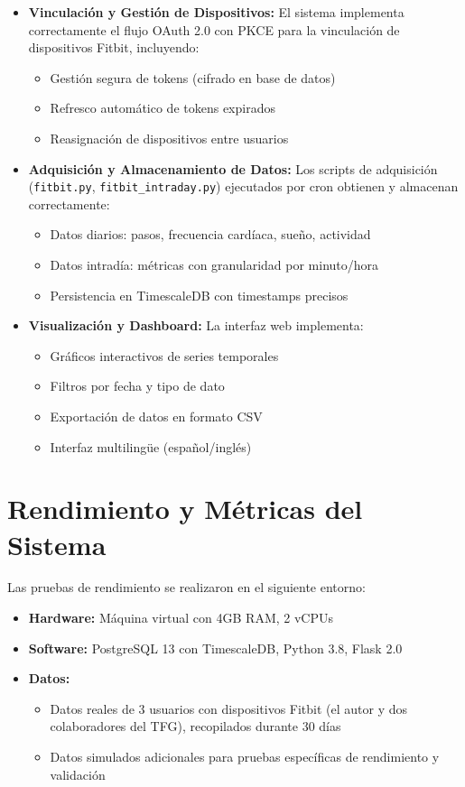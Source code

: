 \begin{itemize}
    \item \textbf{Vinculación y Gestión de Dispositivos:} El sistema implementa correctamente el flujo OAuth 2.0 con PKCE para la vinculación de dispositivos Fitbit\textsuperscript{\textregistered}, incluyendo:
        \begin{itemize}
            \item Gestión segura de tokens (cifrado en base de datos)
            \item Refresco automático de tokens expirados
            \item Reasignación de dispositivos entre usuarios
        \end{itemize}
    \item \textbf{Adquisición y Almacenamiento de Datos:} Los scripts de adquisición (\texttt{fitbit.py}, \texttt{fitbit\_intraday.py}) ejecutados por cron obtienen y almacenan correctamente:
        \begin{itemize}
            \item Datos diarios: pasos, frecuencia cardíaca, sueño, actividad
            \item Datos intradía: métricas con granularidad por minuto/hora
            \item Persistencia en TimescaleDB con timestamps precisos
        \end{itemize}
    \item \textbf{Visualización y Dashboard:} La interfaz web implementa:
        \begin{itemize}
            \item Gráficos interactivos de series temporales
            \item Filtros por fecha y tipo de dato
            \item Exportación de datos en formato CSV
            \item Interfaz multilingüe (español/inglés)
        \end{itemize}
\end{itemize}

\section{Rendimiento y Métricas del Sistema}
\label{sec:rendimiento_metricas}

Las pruebas de rendimiento se realizaron en el siguiente entorno:
\begin{itemize}
    \item \textbf{Hardware:} Máquina virtual con 4GB RAM, 2 vCPUs
    \item \textbf{Software:} PostgreSQL 13 con TimescaleDB, Python 3.8, Flask 2.0
    \item \textbf{Datos:} 
        \begin{itemize}
            \item Datos reales de 3 usuarios con dispositivos Fitbit (el autor y dos colaboradores del TFG), recopilados durante 30 días
            \item Datos simulados adicionales para pruebas específicas de rendimiento y validación
        \end{itemize}
\end{itemize}


